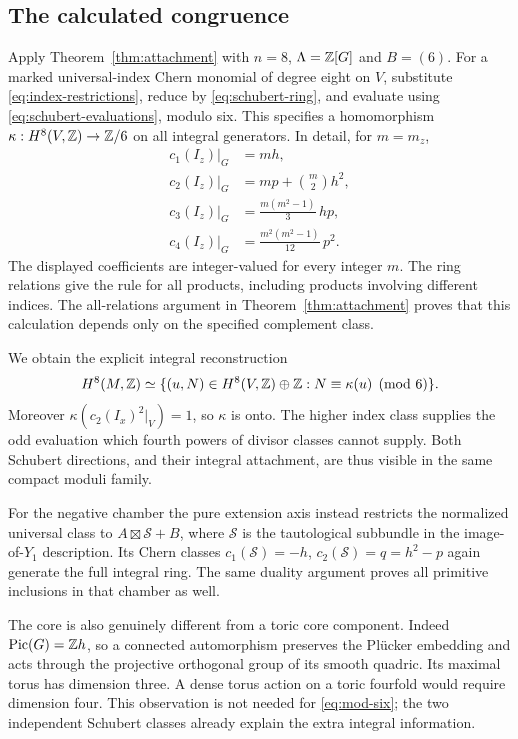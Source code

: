 \subsection{The calculated congruence}
Apply Theorem~\ref{thm:attachment} with \(n=8\),
\(\Lambda=\mathbb Z[G]\) and \(B=(6)\).
For a marked universal-index Chern monomial of degree eight
on \(V\), substitute \eqref{eq:index-restrictions}, reduce by
\eqref{eq:schubert-ring}, and evaluate using
\eqref{eq:schubert-evaluations}, modulo six.
This specifies a homomorphism
\(\kappa:H^8(V,\mathbb Z)\to\mathbb Z/6\) on all integral generators.
In detail, for \(m=m_z\),
\begin{equation}\label{eq:chern-polynomials}
 \begin{aligned}
 c_1(I_z)|_G&=mh,\\
 c_2(I_z)|_G&=mp+\binom m2h^2,\\
 c_3(I_z)|_G&=\frac{m(m^2-1)}3\,hp,\\
 c_4(I_z)|_G&=\frac{m^2(m^2-1)}{12}\,p^2 .
 \end{aligned}
\end{equation}
The displayed coefficients are integer-valued for every integer
\(m\). The ring relations give the rule for all products, including
products involving different indices. The all-relations argument
in Theorem~\ref{thm:attachment} proves that this calculation
depends only on the specified complement class.

We obtain the explicit integral reconstruction
\begin{equation}\label{eq:mod-six}
 H^8(M,\mathbb Z)\simeq
 \{(u,N)\in H^8(V,\mathbb Z)\oplus\mathbb Z:
                  N\equiv\kappa(u)\pmod6\}.
\end{equation}
Moreover
\(\kappa(c_2(I_x)^2|_V)=1\), so \(\kappa\) is onto.
The higher index class supplies the odd evaluation which fourth
powers of divisor classes cannot supply. Both Schubert directions,
and their integral attachment, are thus visible in the same
compact moduli family.

For the negative chamber the pure extension axis instead restricts
the normalized universal class to \(A\boxtimes\mathcal S+B\),
where \(\mathcal S\) is the tautological subbundle in the
image-of-\(Y_1\) description. Its Chern classes
\(c_1(\mathcal S)=-h\), \(c_2(\mathcal S)=q=h^2-p\)
again generate the full integral ring. The same duality argument
proves all primitive inclusions in that chamber as well.

The core is also genuinely different from a toric core component.
Indeed \(\operatorname{Pic}(G)=\mathbb Z h\), so a connected automorphism preserves the
Plücker embedding and acts through the projective orthogonal group
of its smooth quadric. Its maximal torus has dimension three.
A dense torus action on a toric fourfold would require dimension
four. This observation is not needed for \eqref{eq:mod-six};
the two independent Schubert classes already explain the extra
integral information.

